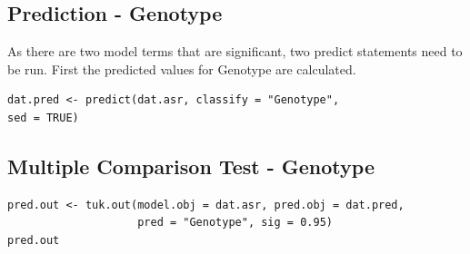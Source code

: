 \documentclass[a4paper, 10pt, fleqn, twosided]{memoir}
\begin{document}
\subsection{Prediction - Genotype}

As there are two model terms that are significant, two predict statements need to be run. First the predicted values
for Genotype are calculated.

\begin{tcolorbox}[title = Example 5 predicted values]
\begin{verbatim}
dat.pred <- predict(dat.asr, classify = "Genotype",
sed = TRUE)
\end{verbatim}
\end{tcolorbox}

\subsection{Multiple Comparison Test - Genotype}

\begin{tcolorbox}[title = Example 5 Tukey's multiple comparison]
\begin{verbatim}
pred.out <- tuk.out(model.obj = dat.asr, pred.obj = dat.pred,
                    pred = "Genotype", sig = 0.95)
pred.out
\end{verbatim}
\end{tcolorbox}
\clearpage
\end{document}
